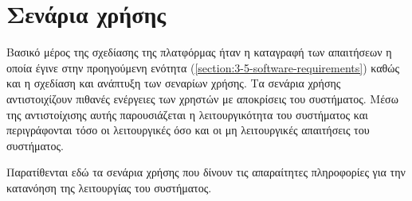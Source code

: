 \section{Σενάρια χρήσης} \label{section:3-6-use-cases}

Βασικό μέρος της σχεδίασης της πλατφόρμας ήταν η καταγραφή των απαιτήσεων η οποία έγινε στην προηγούμενη ενότητα (\ref{section:3-5-software-requirements}) καθώς και η σχεδίαση και ανάπτυξη των σεναρίων χρήσης. Τα σενάρια χρήσης αντιστοιχίζουν πιθανές ενέργειες των χρηστών με αποκρίσεις του συστήματος. Μέσω της αντιστοίχισης αυτής παρουσιάζεται η λειτουργικότητα του συστήματος και περιγράφονται τόσο οι λειτουργικές όσο και οι μη λειτουργικές απαιτήσεις του συστήματος.

Παρατίθενται εδώ τα σενάρια χρήσης που δίνουν τις απαραίτητες πληροφορίες για την κατανόηση της λειτουργίας του συστήματος.











